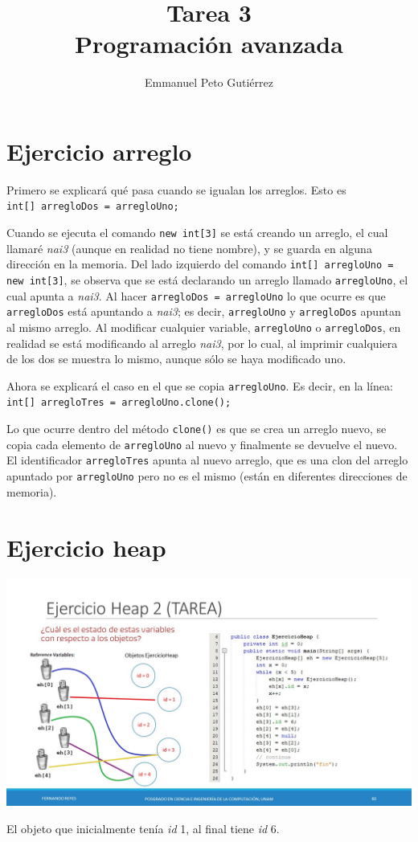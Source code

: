 \documentclass{article}
\title{Tarea 3\\Programación avanzada}
\author{Emmanuel Peto Gutiérrez}
\begin{document}
\maketitle

\section{Ejercicio arreglo}

Primero se explicará qué pasa cuando se igualan los arreglos. Esto es\\
\texttt{int[] arregloDos = arregloUno;}

Cuando se ejecuta el comando \texttt{new int[3]} se está creando un arreglo, el cual llamaré \textit{nai3} (aunque en realidad no tiene nombre), y se guarda en alguna dirección en la memoria. Del lado izquierdo del comando \texttt{int[] arregloUno = new int[3]}, se observa que se está declarando un arreglo llamado \texttt{arregloUno}, el cual apunta a \textit{nai3}. Al hacer \texttt{arregloDos = arregloUno} lo que ocurre es que \texttt{arregloDos} está apuntando a \textit{nai3}; es decir, \texttt{arregloUno} y \texttt{arregloDos} apuntan al mismo arreglo. Al modificar cualquier variable, \texttt{arregloUno} o \texttt{arregloDos}, en realidad se está modificando al arreglo \textit{nai3}, por lo cual, al imprimir cualquiera de los dos se muestra lo mismo, aunque sólo se haya modificado uno.

Ahora se explicará el caso en el que se copia \texttt{arregloUno}. Es decir, en la línea:\\
\texttt{int[] arregloTres = arregloUno.clone();}

Lo que ocurre dentro del método \texttt{clone()} es que se crea un arreglo nuevo, se copia cada elemento de \texttt{arregloUno} al nuevo y finalmente se devuelve el nuevo. El identificador \texttt{arregloTres} apunta al nuevo arreglo, que es una clon del arreglo apuntado por \texttt{arregloUno} pero no es el mismo (están en diferentes direcciones de memoria).

\section{Ejercicio heap}

\includegraphics[width=\linewidth]{ejercicioheap2.png}

El objeto que inicialmente tenía \textit{id} 1, al final tiene \textit{id} 6.
\end{document}
